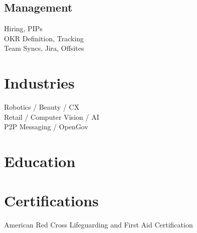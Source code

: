 \begin{minipage}[t]{0.33\textwidth}
  \subsection{Management}
  Hiring, PIPs\\
  OKR Definition, Tracking\\
  Team Syncs, Jira, Offsites
  \sectionsepright

  \section{Industries}
  Robotics / Beauty / CX\\
  Retail / Computer Vision / AI\\
  P2P Messaging / OpenGov
  \sectionsepright

  \section{Education}

  \sectionsepright

  \sectionsepright

  \section{Certifications}
  \raggedright American Red Cross Lifeguarding and First Aid Certification

\end{minipage} %

